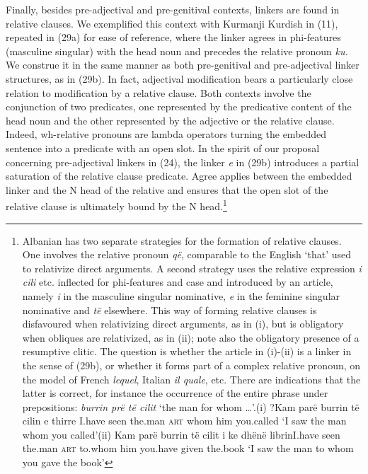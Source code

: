 \documentclass[output=paper]{langsci/langscibook}
\begin{document}
\begin{styleGrigliamediaiiColorexi}
  Finally, besides pre-adjectival and pre-genitival contexts, linkers are found in relative clauses. We exemplified this context with Kurmanji Kurdish in (11), repeated in (29a) for ease of reference, where the linker agrees in phi-features (masculine singular) with the head noun and precedes the relative pronoun \textit{ku.} We construe it in the same manner as both pre-genitival and pre-adjectival linker structures, as in (29b). In fact, adjectival modification bears a particularly close relation to modification by a relative clause. Both contexts involve the conjunction of two predicates, one represented by the predicative content of the head noun and the other represented by the adjective or the relative clause. Indeed, wh-relative pronouns are lambda operators turning the embedded sentence into a predicate with an open slot. In the spirit of our proposal concerning pre-adjectival linkers in (24), the linker \textit{e} in (29b) introduces a partial saturation of the relative clause predicate. Agree applies between the embedded linker and the N head of the relative and ensures that the open slot of the relative clause is ultimately bound by the N head.\footnote{Albanian has two separate strategies for the formation of relative clauses. One involves the relative pronoun \textit{që}, comparable to the English ‘that’ used to relativize direct arguments. A second strategy uses the relative expression \textit{i} \textit{cili} etc. inflected for phi-features and case and introduced by an article, namely \textit{i} in the masculine singular nominative, \textit{e} in the feminine singular nominative and \textit{të} elsewhere. This way of forming relative clauses is disfavoured when relativizing direct arguments, as in (i), but is obligatory when obliques are relativized, as in (ii); note also the obligatory presence of a resumptive clitic. The question is whether the article in (i)-(ii) is a linker in the sense of (29b), or whether it forms part of a complex relative pronoun, on the model of French \textit{lequel}, Italian \textit{il quale}, etc. There are indications that the latter is correct, for instance the occurrence of the entire phrase under prepositions: \textit{burrin prë të cilit} ‘the man for whom …’.(i)  ?Kam  parë   burrin   të   cilin   e   thirre   I.have   seen   the.man  \textsc{art}   whom  him   you.called  ‘I saw the man whom you called’(ii)  Kam  parë   burrin   të   cilit     i   ke     dhënë   librinI.have   seen  the.man  \textsc{art}   to.whom    him   you.have   given   the.book  ‘I saw the man to whom you gave the book’}  
\end{styleGrigliamediaiiColorexi}
\end{document}
